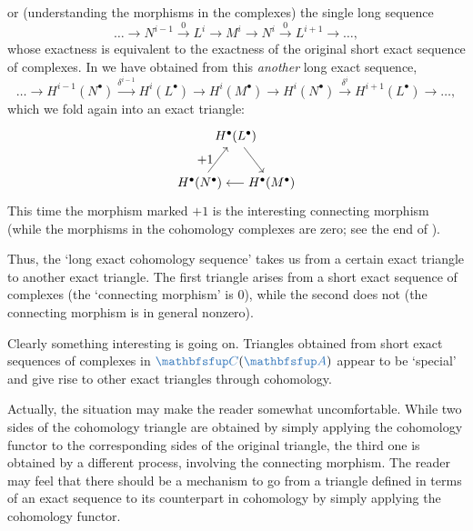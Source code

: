 or (understanding the morphisms in the complexes) the single long
sequence
\[
  \dots \longrightarrow N^{i-1} \xrightarrow{0} L^i \longrightarrow
  M^i \longrightarrow N^i \xrightarrow{0} L^{i+1} \longrightarrow
  \dots,
\]
whose exactness is equivalent to the exactness of the original short
exact sequence of complexes. In
 we have
obtained from this \emph{another} long exact sequence,
\[
  \dots \longrightarrow H^{i-1}(N^\bullet) \xrightarrow{\delta^{i-1}}
  H^i(L^\bullet) \longrightarrow H^i(M^\bullet) \longrightarrow
  H^i(N^\bullet) \xrightarrow{\delta^i} H^{i+1}(L^\bullet)
  \longrightarrow \dots,
\]
which we fold again into an exact triangle:
\[
  \begin{tikzpicture}[baseline=(current bounding box.center)]
    \node (L) at (1,1.3)
    {$H^\bullet(L^\bullet)$}; \node (N) at (0,0)
    {$H^\bullet(N^\bullet)$}; \node (M) at (2,0)
    {$H^\bullet(M^\bullet)$}; \draw[->] (L) -- (M); \draw[->] (M) --
    (N); \draw[->] (N) -- (L) node[midway, left] {$+1$};
  \end{tikzpicture}
\]
This time the morphism marked $+1$ is the interesting connecting
morphism (while the morphisms in the cohomology complexes are zero;
see the end of ).

Thus, the `long exact cohomology sequence' takes us from a certain
exact triangle to another exact triangle. The first triangle arises
from a short exact sequence of complexes (the `connecting morphism' is
$0$), while the second does not (the connecting morphism is in general
nonzero).

Clearly something interesting is going on. Triangles obtained from
short exact sequences of complexes in $\categ{C}(\categ{A})$ appear to
be `special' and give rise to other exact triangles through
cohomology.

Actually, the situation may make the reader somewhat uncomfortable.
While two sides of the cohomology triangle are obtained by simply
applying the cohomology functor to the corresponding sides of the
original triangle, the third one is obtained by a different process,
involving the connecting morphism. The reader may feel that there
should be a mechanism to go from a triangle defined in terms of an
exact sequence to its counterpart in cohomology by simply applying the
cohomology functor.

